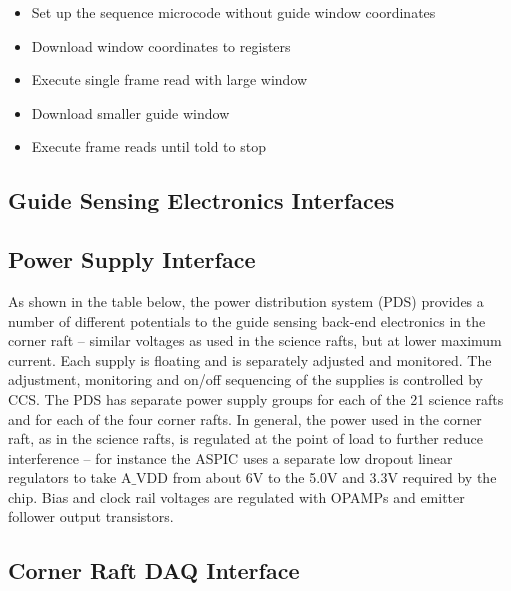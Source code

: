 \begin{itemize}
\item{}Set up the sequence microcode without guide window coordinates
\item{} Download window coordinates to registers
\item{} Execute single frame read with large window
\item{} Download smaller guide window
\item{} Execute frame reads until told to stop
\end{itemize}

\subsection{Guide Sensing Electronics Interfaces}

\subsection{Power Supply Interface}

As shown in the table below, the power distribution system (PDS) provides a number of different
potentials to the guide sensing back-end electronics in the corner raft – similar voltages as used in the
science rafts, but at lower maximum current. Each supply is floating and is separately adjusted and
monitored. The adjustment, monitoring and on/off sequencing of the supplies is controlled by CCS.
The PDS has separate power supply groups for each of the 21 science rafts and for each of the four
corner rafts. In general, the power used in the corner raft, as in the science rafts, is regulated at the
point of load to further reduce interference – for instance the ASPIC uses a separate low dropout linear
regulators to take A$\_$VDD from about 6V to the 5.0V and 3.3V required by the chip. Bias and clock rail
voltages are regulated with OPAMPs and emitter follower output transistors.


\subsection{Corner Raft DAQ Interface} 

